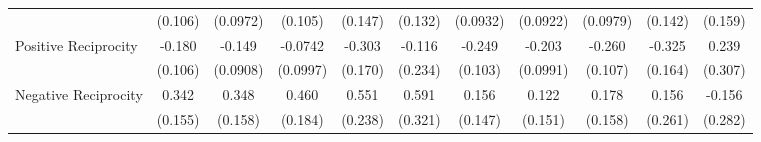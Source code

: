 {\begin{tabular}{l*{10}{c}}
            &     (0.106)         &    (0.0972)         &     (0.105)         &     (0.147)         &     (0.132)         &    (0.0932)         &    (0.0922)         &    (0.0979)         &     (0.142)         &     (0.159)         \\
\addlinespace
Positive Reciprocity&      -0.180         &      -0.149         &     -0.0742         &      -0.303         &      -0.116         &      -0.249\sym{*}  &      -0.203\sym{*}  &      -0.260\sym{*}  &      -0.325\sym{*}  &       0.239         \\
            &     (0.106)         &    (0.0908)         &    (0.0997)         &     (0.170)         &     (0.234)         &     (0.103)         &    (0.0991)         &     (0.107)         &     (0.164)         &     (0.307)         \\
\addlinespace
Negative Reciprocity&       0.342\sym{*}  &       0.348\sym{*}  &       0.460\sym{*}  &       0.551\sym{*}  &       0.591         &       0.156         &       0.122         &       0.178         &       0.156         &      -0.156         \\
            &     (0.155)         &     (0.158)         &     (0.184)         &     (0.238)         &     (0.321)         &     (0.147)         &     (0.151)         &     (0.158)         &     (0.261)         &     (0.282)         \\
\bottomrule
\end{tabular}
}
